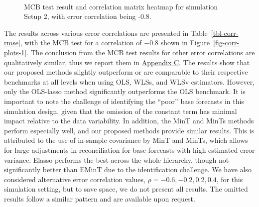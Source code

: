 \documentclass[
  11pt]{article}
\theoremstyle{plain}
\theoremstyle{remark}
\begin{document}
\begin{table}
{}

\end{table}%

\begin{figure}

\begin{minipage}{0.48\linewidth}



\end{minipage}%
%
\begin{minipage}{0.04\linewidth}
~\end{minipage}%
%
\begin{minipage}{0.48\linewidth}



\end{minipage}%

\caption{\label{fig-corr-plots}MCB test result and correlation matrix
heatmap for simulation Setup 2, with error correlation being -0.8.}

\end{figure}%

The results across various error correlations are presented in
Table~\ref{tbl-corr-rmse}, with the MCB test for a correlation of
\(-0.8\) shown in Figure~\ref{fig-corr-plots-1}. The conclusion from the
MCB test results for other error correlations are qualitatively similar,
thus we report them in \hyperref[appendix-sim2]{Appendix C}. The results
show that our proposed methods slightly outperform or are comparable to
their respective benchmarks at all levels when using OLS, WLSs, and WLSv
estimators. However, only the OLS-lasso method significantly outperforms
the OLS benchmark. It is important to note the challenge of identifying
the ``poor'' base forecasts in this simulation design, given that the
omission of the constant term has minimal impact relative to the data
variability. In addition, the MinT and MinTs methods perform especially
well, and our proposed methods provide similar results. This is
attributed to the use of in-sample covariance by MinT and MinTs, which
allows for large adjustments in reconciliation for base forecasts with
high estimated error variance. Elasso performs the best across the whole
hierarchy, though not significantly better than EMinT due to the
identification challenge. We have also considered alternative error
correlation values, \(\rho = -0.6, -0.2, 0.2, 0.4\), for this simulation
setting, but to save space, we do not present all results. The omitted
results follow a similar pattern and are available upon request.
\end{document}
